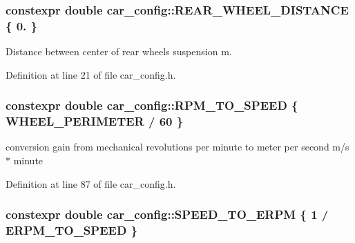 \subsubsection[{\texorpdfstring{R\+E\+A\+R\+\_\+\+W\+H\+E\+E\+L\+\_\+\+D\+I\+S\+T\+A\+N\+CE}{REAR_WHEEL_DISTANCE}}]{\setlength{\rightskip}{0pt plus 5cm}constexpr double car\+\_\+config\+::\+R\+E\+A\+R\+\_\+\+W\+H\+E\+E\+L\+\_\+\+D\+I\+S\+T\+A\+N\+CE \{ 0. \}}\hypertarget{namespacecar__config_a43e668702c6dc662ff95f80047ee5500}{}\label{namespacecar__config_a43e668702c6dc662ff95f80047ee5500}


Distance between center of rear wheels suspension  m. 



Definition at line 21 of file car\+\_\+config.\+h.

\subsubsection[{\texorpdfstring{R\+P\+M\+\_\+\+T\+O\+\_\+\+S\+P\+E\+ED}{RPM_TO_SPEED}}]{\setlength{\rightskip}{0pt plus 5cm}constexpr double car\+\_\+config\+::\+R\+P\+M\+\_\+\+T\+O\+\_\+\+S\+P\+E\+ED \{ {\bf W\+H\+E\+E\+L\+\_\+\+P\+E\+R\+I\+M\+E\+T\+ER} / 60 \}}\hypertarget{namespacecar__config_aee034b6adfd7932f245bc94d869f2bb6}{}\label{namespacecar__config_aee034b6adfd7932f245bc94d869f2bb6}


conversion gain from mechanical revolutions per minute to meter per second  m/s $\ast$ minute 



Definition at line 87 of file car\+\_\+config.\+h.

\subsubsection[{\texorpdfstring{S\+P\+E\+E\+D\+\_\+\+T\+O\+\_\+\+E\+R\+PM}{SPEED_TO_ERPM}}]{\setlength{\rightskip}{0pt plus 5cm}constexpr double car\+\_\+config\+::\+S\+P\+E\+E\+D\+\_\+\+T\+O\+\_\+\+E\+R\+PM \{ 1 / {\bf E\+R\+P\+M\+\_\+\+T\+O\+\_\+\+S\+P\+E\+ED} \}}\hypertarget{namespacecar__config_a0f37aa7e52366aebb006c6e1d3317900}{}\label{namespacecar__config_a0f37aa7e52366aebb006c6e1d3317900}


